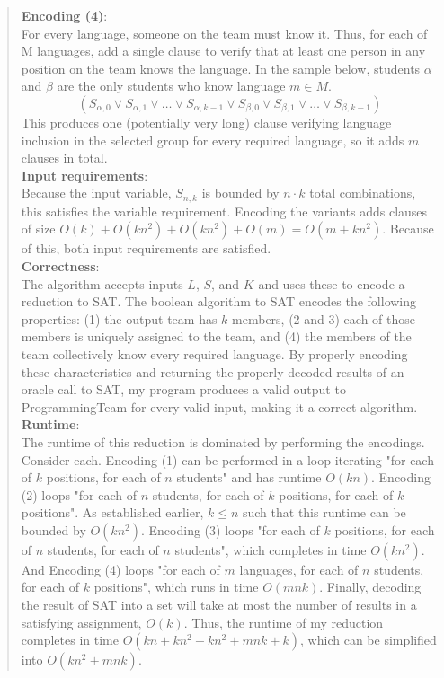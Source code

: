 \documentclass[11pt]{article}
\begin{document}
\begin{enumerate}
\begin{enumerate}
\begin{quote}
    \textbf{Encoding (4)}: \\
    For every language, someone on the team must know it. Thus, for each of M languages, add a single clause to verify that at least one person in any position on the team knows the language. In the sample below, students $\alpha$ and $\beta$ are the only students who know language $m \in M$.
    $$(S_{\alpha, 0} \lor S_{\alpha, 1} \lor \dots \lor S_{\alpha, k - 1} \lor S_{\beta, 0} \lor S_{\beta, 1} \lor \dots \lor S_{\beta, k - 1})$$
    This produces one (potentially very long) clause verifying language inclusion in the selected group for every required language, so it adds $m$ clauses in total. \\

    \textbf{Input requirements}: \\
    Because the input variable, $S_{n, k}$ is bounded by $n \cdot k$ total combinations, this satisfies the variable requirement. Encoding the variants adds clauses of size $O(k) + O(kn^2) + O(kn^2) + O(m) = O(m + kn^2)$. Because of this, both input requirements are satisfied. \\

    \textbf{Correctness}: \\
    The algorithm accepts inputs $L$, $S$, and $K$ and uses these to encode a reduction to SAT. The boolean algorithm to SAT encodes the following properties: (1) the output team has $k$ members, (2 and 3) each of those members is uniquely assigned to the team, and (4) the members of the team collectively know every required language. By properly encoding these characteristics and returning the properly decoded results of an oracle call to SAT, my program produces a valid output to ProgrammingTeam for every valid input, making it a correct algorithm. \\

    \textbf{Runtime}: \\
    The runtime of this reduction is dominated by performing the encodings. Consider each. Encoding (1) can be performed in a loop iterating "for each of $k$ positions, for each of $n$ students" and has runtime $O(kn)$. Encoding (2) loops "for each of $n$ students, for each of $k$ positions, for each of $k$ positions". As established earlier, $k \leq n$ such that this runtime can be bounded by $O(kn^2)$. Encoding (3) loops "for each of $k$ positions, for each of $n$ students, for each of $n$ students", which completes in time $O(kn^2)$. And Encoding (4) loops "for each of $m$ languages, for each of $n$ students, for each of $k$ positions", which runs in time $O(mnk)$. Finally, decoding the result of SAT into a set will take at most the number of results in a satisfying assignment, $O(k)$. Thus, the runtime of my reduction completes in time $O(kn + kn^2 + kn^2 + mnk + k)$, which can be simplified into $O(kn^2 + mnk)$.
    

\end{quote}
\end{enumerate}
\end{enumerate}
\end{document}
